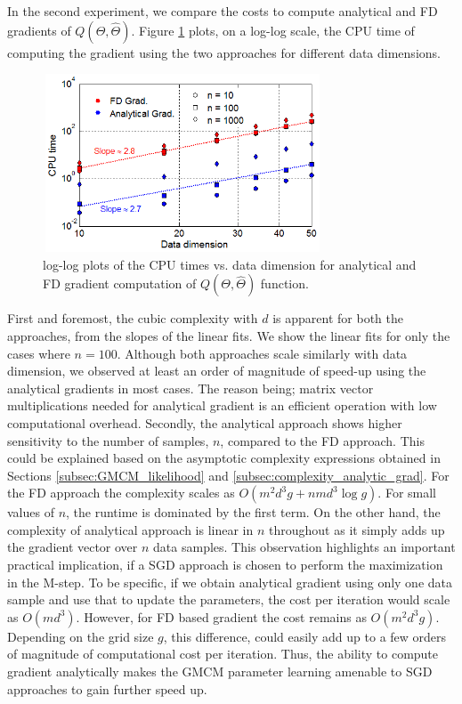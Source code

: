 \documentclass[]{article}
\begin{document}
In the second experiment, we compare the costs to compute analytical and FD gradients of $Q(\Theta,\hat{\Theta})$. Figure \ref{fig:complexity_comp} plots, on a log-log scale, the CPU time of computing the gradient using the two approaches for different data dimensions.   

\begin{figure}[h]
\includegraphics[width= 235pt,height=150pt]{computational_complexity_analytics_vs_fd_grad}
\caption{log-log plots of  the CPU times vs. data dimension for analytical and FD gradient computation of $Q(\Theta,\hat{\Theta})$ function.}
\label{fig:complexity_comp}
\end{figure}
First and foremost, the cubic complexity with $d$ is apparent for both the approaches, from the slopes of the linear fits. We show the linear fits for only the cases where $n=100$. Although both approaches scale similarly with data dimension, we observed at least an order of magnitude of speed-up using the analytical gradients in most cases. The reason being; matrix vector multiplications needed for analytical gradient is an efficient operation with low computational overhead. Secondly, the analytical approach shows higher sensitivity to the number of samples,  $n$, compared to the FD approach. This could be explained based on the asymptotic complexity expressions obtained in Sections \ref{subsec:GMCM_likelihood} and \ref{subsec:complexity_analytic_grad}. For the FD approach the complexity scales as $O\left(m^2d^3g+nmd^3\log{g}\right)$. For small values of $n$, the runtime is dominated by the first term. On the other hand, the complexity of analytical approach is linear in $n$ throughout as it simply adds up the gradient vector over  $n$ data samples. This observation highlights an important practical implication, if a SGD approach is chosen to perform the maximization in the M-step. To be specific, if we obtain analytical gradient using only one data sample and use that to update the parameters, the cost per iteration would scale as $O(md^3)$. However, for FD based gradient the cost remains as $O\left(m^2d^3g\right)$. Depending on the grid size $g$, this difference, could easily add up to a few orders of magnitude of computational cost per iteration. Thus, the ability to compute gradient analytically makes the GMCM parameter learning amenable to SGD approaches to gain further speed up.
\end{document}
